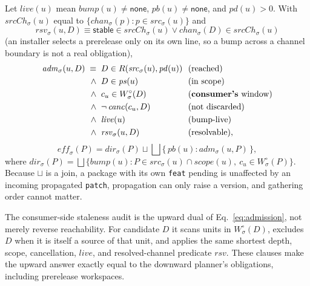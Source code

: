 \documentclass[sigconf,nonacm]{acmart}
\newcommand{\code}[1]{\texttt{#1}}
\begin{document}
\begin{definition}
\label{def:adm}
Let $\mathit{live}(u)$ mean $\mathit{bump}(u)\neq\mathsf{none}$,
$\mathit{pb}(u)\neq\mathsf{none}$, and $\mathit{pd}(u)>0$. With
$\mathit{srcCh}_\sigma(u)$ equal to
$\{\mathit{chan}_\sigma(p) : p \in \mathit{src}_\sigma(u)\}$ and
\begin{equation}
  \mathit{rsv}_\sigma(u,D) \equiv \mathsf{stable} \in
  \mathit{srcCh}_\sigma(u) \lor \mathit{chan}_\sigma(D) \in
  \mathit{srcCh}_\sigma(u)
  \label{eq:resolvable}
\end{equation}
(an installer selects a prerelease only on its own line, so a bump
across a channel boundary is not a real obligation),
\begin{equation}
\label{eq:admission}
\begin{aligned}
  \mathit{adm}_\sigma(u,D) \;\equiv\;\;
     & D \in R(\mathit{src}_\sigma(u), \mathit{pd}(u))
     &\!\!& \text{(reached)} \\
  \wedge\;\; & D \in \mathit{ps}(u)
     &\!\!& \text{(in scope)} \\
  \wedge\;\; & c_u \in W^\circ_\sigma(D)
     &\!\!& \text{(\textbf{consumer's} window)} \\
  \wedge\;\; & \neg\,\mathit{canc}(c_u, D)
     &\!\!& \text{(not discarded)} \\
  \wedge\;\; & \mathit{live}(u)
     &\!\!& \text{(bump-live)} \\
  \wedge\;\; & \mathit{rsv}_\sigma(u, D)
     &\!\!& \text{(resolvable),}
\end{aligned}
\end{equation}
\begin{equation}
\label{eq:effective}
  \mathit{eff}_\sigma(P) = \mathit{dir}_\sigma(P) \sqcup
  \bigsqcup \{\, \mathit{pb}(u) : \mathit{adm}_\sigma(u,P) \,\},
\end{equation}
where $\mathit{dir}_\sigma(P) = \bigsqcup\{\mathit{bump}(u) : P \in
\mathit{src}_\sigma(u) \cap \mathit{scope}(u),\ c_u \in W^\circ_\sigma(P)\}$.
Because $\sqcup$ is a join, a package with its own \code{feat} pending
is unaffected by an incoming propagated \code{patch}, propagation can
only raise a version, and gathering order cannot matter.
\end{definition}

The consumer-side staleness audit is the upward dual of
Eq.~\ref{eq:admission}, not merely reverse reachability. For candidate $D$
it scans units in $W^\circ_\sigma(D)$, excludes $D$ when it is itself a
source of that unit, and applies the same shortest depth, scope,
cancellation, $\mathit{live}$, and resolved-channel predicate $\mathit{rsv}$. These clauses
make the upward answer exactly equal to the downward planner's obligations,
including prerelease workspaces.
\end{document}
